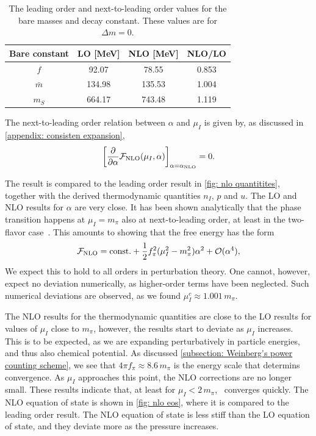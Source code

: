 \begin{table}[!htb]
    \centering
    \caption{The leading order and next-to-leading order values for the bare masses and decay constant. These values are for $\Delta m = 0$.}
    \label{table: nlo values}
    \begin{tabular}{c c c c}
        \hline \hline
        Bare constant & LO [MeV] & NLO [MeV] & NLO/LO \\
        \hline
        $f$ & 92.07 & 78.55 & 0.853\\
        $\bar m$ & 134.98 & 135.53 & 1.004 \\
        $m_S$ & 664.17 & 743.48 & 1.119 \\
        \hline
    \end{tabular}
\end{table}


The next-to-leading order relation between $\alpha$ and $\mu_I$ is given by, as discussed in \autoref{appendix: consisten expansion},
%
\begin{equation}
    \left[\pdv*{\mathcal{F}_\text{NLO}(\mu_I, \alpha)}{\alpha} \right]_{\alpha = \alpha_\text{NLO}} = 0.
\end{equation}
%

The result is compared to the leading order result in \autoref{fig: nlo quantitites}, together with the derived thermodynamic quantities $n_I$, $p$ and $u$.
The LO and NLO results for $\alpha$ are very close.
It has been shown analytically that the phase transition happens at $\mu_I=m_\pi$ also at next-to-leading order, at least in the two-flavor case~\autocite{adhikariTwoflavorChiralPerturbation2019}.
This amounts to showing that the free energy has the form
%
\begin{equation}
    \mathcal{F}_\text{NLO} = \mathrm{const.} + \frac{1}{2} f_\pi^2 (\mu_I^2 - m_\pi^2)\alpha^2 + \mathcal O(\alpha^4),
\end{equation}
%
We expect this to hold to all orders in perturbation theory.
One cannot, however, expect no deviation numerically, as higher-order terms have been neglected.
Such numerical deviations are observed, as we found $\mu_I^c \approx 1.001\,m_\pi$.

The NLO results for the thermodynamic quantities are close to the LO results for values of $\mu_I$ close to $m_\pi$, however, the results start to deviate as $\mu_I$ increases.
This is to be expected, as we are expanding perturbatively in particle energies, and thus also chemical potential.
As discussed \autoref{subsection: Weinberg's power counting scheme}, we see that $4\pi f_\pi \approx 8.6 \,m_\pi$ is the energy scale that determins convergence.
As $\mu_I$ approaches this point, the NLO corrections are no longer small.
These results indicate that, at least for $\mu_I< 2\,m_\pi$, \chpt\, converges quickly.
The NLO equation of state is shown in \autoref{fig: nlo eos}, where it is compared to the leading order result.
The NLO equation of state is less stiff than the LO equation of state, and they deviate more as the pressure increases.

